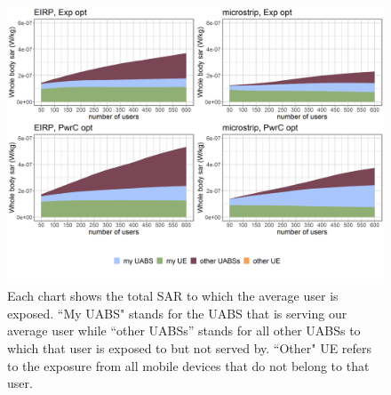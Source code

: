 \begin{figure}[h!]
  \includegraphics[width=\textwidth]{../results/s3/uFourSources.png}
  \caption{Each chart shows the total SAR to which the average user is exposed. ``My UABS" stands for the UABS that is serving our average user while ``other UABSs'' stands for 
  all other UABSs to which that user is exposed to but not served by. ``Other" UE refers to the exposure from all mobile devices that do not belong to that user.}
  \label{fig:s3b_fourSourcesMatrix}
\end{figure}